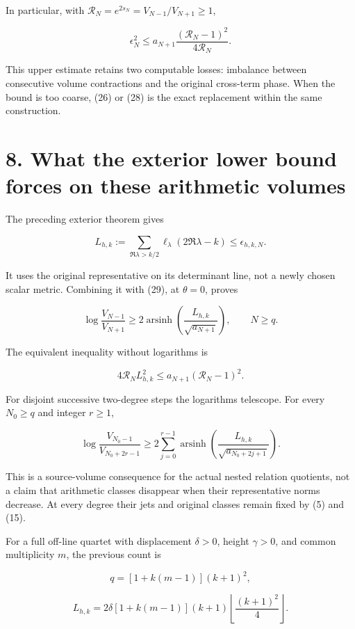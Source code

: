 \documentclass[
  11pt,
]{article}
\begin{document}
In particular, with \(\mathcal R_N=e^{2s_N}=V_{N-1}/V_{N+1}\ge1\),

\[
\boxed{
\epsilon_N^2\le a_{N+1}\frac{(\mathcal R_N-1)^2}{4\mathcal R_N}.
}
\tag{29}
\]

This upper estimate retains two computable losses: imbalance between
consecutive volume contractions and the original cross-term phase. When
the bound is too coarse, (26) or (28) is the exact replacement within
the same construction.

\section{8. What the exterior lower bound forces on these arithmetic
volumes}\label{what-the-exterior-lower-bound-forces-on-these-arithmetic-volumes}

The preceding exterior theorem gives

\[
L_{h,k}:=\sum_{\Re\lambda>k/2}\ell_\lambda(2\Re\lambda-k)
\le\epsilon_{h,k,N}.
\]

It uses the original representative on its determinant line, not a newly
chosen scalar metric. Combining it with (29), at \(\theta=0\), proves

\[
\boxed{
\log\frac{V_{N-1}}{V_{N+1}}
\ge2\operatorname{arsinh}\!\left(\frac{L_{h,k}}{\sqrt{a_{N+1}}}\right),\qquad N\ge q.
}
\tag{30}
\]

The equivalent inequality without logarithms is

\[
4\mathcal R_N L_{h,k}^2\le a_{N+1}(\mathcal R_N-1)^2.
\]

For disjoint successive two-degree steps the logarithms telescope. For
every \(N_0\ge q\) and integer \(r\ge1\),

\[
\boxed{
\log\frac{V_{N_0-1}}{V_{N_0+2r-1}}
\ge 2\sum_{j=0}^{r-1}
\operatorname{arsinh}\!\left(
\frac{L_{h,k}}{\sqrt{a_{N_0+2j+1}}}\right).
}
\tag{31}
\]

This is a source-volume consequence for the actual nested relation
quotients, not a claim that arithmetic classes disappear when their
representative norms decrease. At every degree their jets and original
classes remain fixed by (5) and (15).

For a full off-line quartet with displacement \(\delta>0\), height
\(\gamma>0\), and common multiplicity \(m\), the previous count is

\[
q=[1+k(m-1)](k+1)^2,
\]

\[
L_{h,k}=2\delta[1+k(m-1)](k+1)
\left\lfloor\frac{(k+1)^2}{4}\right\rfloor.
\tag{32}
\]
\end{document}
